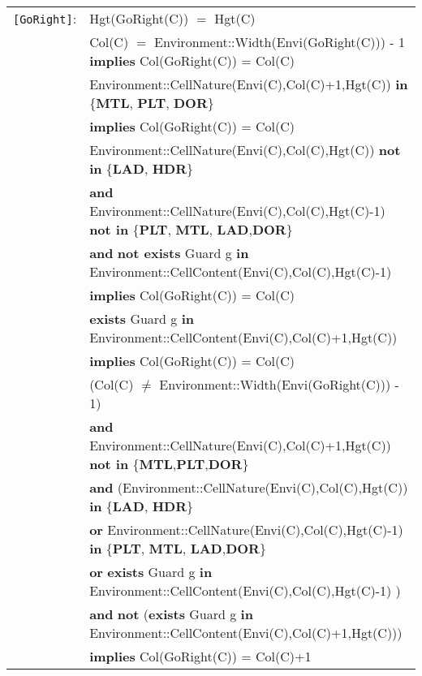 \documentclass[7pt]{article}
\begin{document}
\begin{tabular}{rl}
\texttt{[GoRight]}: & \textrm{Hgt(GoRight(C))} $=$ \textrm{Hgt(C)} \\
& \textrm{Col(C)} $=$ Environment::Width(Envi(GoRight(C))) - 1 \textbf{implies} \textrm{Col(GoRight(C))} = \textrm{Col(C)} \\
& \textrm{Environment::CellNature(Envi(C),Col(C)+1,Hgt(C))} \textbf{in} \{\textbf{MTL}, \textbf{PLT}, \textbf{DOR}\} \\
& \quad \textbf{implies}  \textrm{Col(GoRight(C))} = \textrm{Col(C)} \\
& \textrm{Environment::CellNature(Envi(C),Col(C),Hgt(C))} \textbf{not in} \{\textbf{LAD}, \textbf{HDR}\}
\\ & \quad\quad \textbf{and} \textrm{Environment::CellNature(Envi(C),Col(C),Hgt(C)-1)} \textbf{not in} \{\textbf{PLT}, \textbf{MTL}, \textbf{LAD},\textbf{DOR}\} \\
& \quad\quad \textbf{and} \textbf{not exists} \textrm{Guard} g \textbf{in} \textrm{Environment::CellContent(Envi(C),Col(C),Hgt(C)-1)} \\
& \quad\quad \textbf{implies} \textrm{Col(GoRight(C))} = \textrm{Col(C)} \\
& \textbf{exists} \textrm{Guard} g \textbf{in} \textrm{Environment::CellContent(Envi(C),Col(C)+1,Hgt(C))} \\ & \quad\quad \textbf{implies} \textrm{Col(GoRight(C))} = \textrm{Col(C)} \\

& (\textrm{Col(C)} $\neq$  Environment::Width(Envi(GoRight(C))) - 1) \\
& \quad\quad \textbf{and} \textrm{Environment::CellNature(Envi(C),Col(C)+1,Hgt(C))} \textbf{not in} \{\textbf{MTL},\textbf{PLT},\textbf{DOR}\} \\
& \quad\quad \textbf{and} (\textrm{Environment::CellNature(Envi(C),Col(C),Hgt(C))} \textbf{in} \{\textbf{LAD}, \textbf{HDR}\} \\
& \quad\quad\quad\quad \textbf{or} \textrm{Environment::CellNature(Envi(C),Col(C),Hgt(C)-1)} \textbf{in} \{\textbf{PLT}, \textbf{MTL}, \textbf{LAD},\textbf{DOR}\} \\
& \quad\quad\quad\quad \textbf{or} \textbf{exists} \textrm{Guard} g \textbf{in} \textrm{Environment::CellContent(Envi(C),Col(C),Hgt(C)-1)} ) \\
& \quad\quad \textbf{and} \textbf{not} (\textbf{exists} \textrm{Guard} g \textbf{in} \textrm{Environment::CellContent(Envi(C),Col(C)+1,Hgt(C))}) \\
& \quad\quad \textbf{implies} \textrm{Col(GoRight(C))} = \textrm{Col(C)}+1 \\

\end{tabular}
\end{document}
